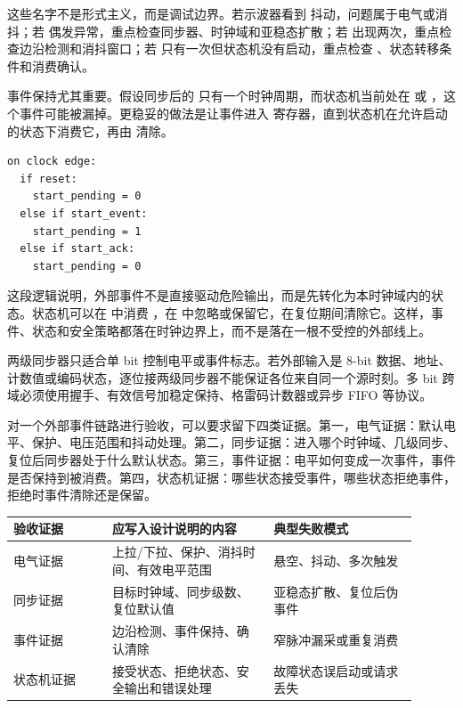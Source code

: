 这些名字不是形式主义，而是调试边界。若示波器看到  抖动，问题属于电气或消抖；若  偶发异常，重点检查同步器、时钟域和亚稳态扩散；若  出现两次，重点检查边沿检测和消抖窗口；若  只有一次但状态机没有启动，重点检查 、状态转移条件和消费确认。

事件保持尤其重要。假设同步后的  只有一个时钟周期，而状态机当前处在  或 ，这个事件可能被漏掉。更稳妥的做法是让事件进入  寄存器，直到状态机在允许启动的状态下消费它，再由  清除。

\begin{lstlisting}
on clock edge:
  if reset:
    start_pending = 0
  else if start_event:
    start_pending = 1
  else if start_ack:
    start_pending = 0
\end{lstlisting}

这段逻辑说明，外部事件不是直接驱动危险输出，而是先转化为本时钟域内的状态。状态机可以在  中消费 ，在  中忽略或保留它，在复位期间清除它。这样，事件、状态和安全策略都落在时钟边界上，而不是落在一根不受控的外部线上。

\begin{warningbox}
两级同步器只适合单 bit 控制电平或事件标志。若外部输入是 8-bit 数据、地址、计数值或编码状态，逐位接两级同步器不能保证各位来自同一个源时刻。多 bit 跨域必须使用握手、有效信号加稳定保持、格雷码计数器或异步 FIFO 等协议。
\end{warningbox}

对一个外部事件链路进行验收，可以要求留下四类证据。第一，电气证据：默认电平、保护、电压范围和抖动处理。第二，同步证据：进入哪个时钟域、几级同步、复位后同步器处于什么默认状态。第三，事件证据：电平如何变成一次事件，事件是否保持到被消费。第四，状态机证据：哪些状态接受事件，哪些状态拒绝事件，拒绝时事件清除还是保留。

\begin{longtable}{L{0.22\linewidth}L{0.36\linewidth}L{0.32\linewidth}}
\toprule
验收证据 & 应写入设计说明的内容 & 典型失败模式 \\
\midrule
电气证据 & 上拉/下拉、保护、消抖时间、有效电平范围 & 悬空、抖动、多次触发 \\
同步证据 & 目标时钟域、同步级数、复位默认值 & 亚稳态扩散、复位后伪事件 \\
事件证据 & 边沿检测、事件保持、确认清除 & 窄脉冲漏采或重复消费 \\
状态机证据 & 接受状态、拒绝状态、安全输出和错误处理 & 故障状态误启动或请求丢失 \\
\bottomrule
\end{longtable}

